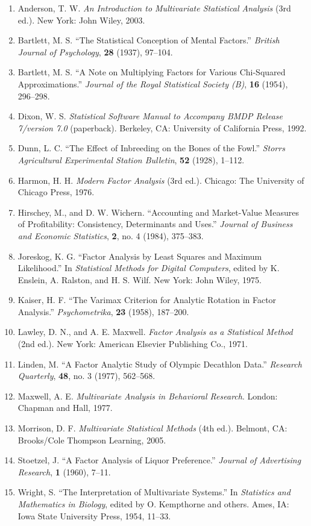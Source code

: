 \begin{enumerate}[leftmargin=2.2em,itemsep=2pt]
\item Anderson, T. W. \textit{An Introduction to Multivariate Statistical Analysis} (3rd ed.). New York: John Wiley, 2003.
\item Bartlett, M. S. “The Statistical Conception of Mental Factors.” \textit{British Journal of Psychology}, \textbf{28} (1937), 97--104.
\item Bartlett, M. S. “A Note on Multiplying Factors for Various Chi-Squared Approximations.” \textit{Journal of the Royal Statistical Society (B)}, \textbf{16} (1954), 296--298.
\item Dixon, W. S. \textit{Statistical Software Manual to Accompany BMDP Release 7/version 7.0} (paperback). Berkeley, CA: University of California Press, 1992.
\item Dunn, L. C. “The Effect of Inbreeding on the Bones of the Fowl.” \textit{Storrs Agricultural Experimental Station Bulletin}, \textbf{52} (1928), 1--112.
\item Harmon, H. H. \textit{Modern Factor Analysis} (3rd ed.). Chicago: The University of Chicago Press, 1976.
\item Hirschey, M., and D. W. Wichern. “Accounting and Market-Value Measures of Profitability: Consistency, Determinants and Uses.” \textit{Journal of Business and Economic Statistics}, \textbf{2}, no. 4 (1984), 375--383.
\item Joreskog, K. G. “Factor Analysis by Least Squares and Maximum Likelihood.” In \textit{Statistical Methods for Digital Computers}, edited by K. Enslein, A. Ralston, and H. S. Wilf. New York: John Wiley, 1975.
\item Kaiser, H. F. “The Varimax Criterion for Analytic Rotation in Factor Analysis.” \textit{Psychometrika}, \textbf{23} (1958), 187--200.
\item Lawley, D. N., and A. E. Maxwell. \textit{Factor Analysis as a Statistical Method} (2nd ed.). New York: American Elsevier Publishing Co., 1971.
\item Linden, M. “A Factor Analytic Study of Olympic Decathlon Data.” \textit{Research Quarterly}, \textbf{48}, no. 3 (1977), 562--568.
\item Maxwell, A. E. \textit{Multivariate Analysis in Behavioral Research}. London: Chapman and Hall, 1977.
\item Morrison, D. F. \textit{Multivariate Statistical Methods} (4th ed.). Belmont, CA: Brooks/Cole Thompson Learning, 2005.
\item Stoetzel, J. “A Factor Analysis of Liquor Preference.” \textit{Journal of Advertising Research}, \textbf{1} (1960), 7--11.
\item Wright, S. “The Interpretation of Multivariate Systems.” In \textit{Statistics and Mathematics in Biology}, edited by O. Kempthorne and others. Ames, IA: Iowa State University Press, 1954, 11--33.
\end{enumerate}
